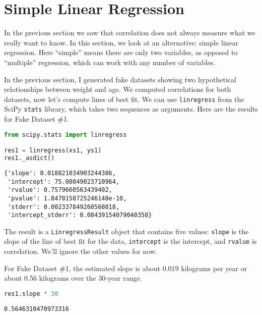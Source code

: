 \section{Simple Linear Regression}\label{simple-linear-regression}

In the previous section we saw that correlation does not always measure
what we really want to know. In this section, we look at an alternative:
simple linear regression. Here ``simple'' means there are only two
variables, as opposed to ``multiple'' regression, which can work with
any number of variables.

In the previous section, I generated fake datasets showing two
hypothetical relationships between weight and age. We computed
correlations for both datasets, now let's compute lines of best fit. We
can use \passthrough{\lstinline!linregress!} from the SciPy
\passthrough{\lstinline!stats!} library, which takes two sequences as
arguments. Here are the results for Fake Dataset \#1.


\begin{lstlisting}[language=Python,style=source]
from scipy.stats import linregress

res1 = linregress(xs1, ys1)
res1._asdict()
\end{lstlisting}

\begin{lstlisting}[style=output]
{'slope': 0.018821034903244386,
 'intercept': 75.08049023710964,
 'rvalue': 0.7579660563439402,
 'pvalue': 1.8470158725246148e-10,
 'stderr': 0.002337849260560818,
 'intercept_stderr': 0.08439154079040358}
\end{lstlisting}

The result is a \passthrough{\lstinline!LinregressResult!} object that
contains five values: \passthrough{\lstinline!slope!} is the slope of
the line of best fit for the data, \passthrough{\lstinline!intercept!}
is the intercept, and \passthrough{\lstinline!rvalue!} is correlation.
We'll ignore the other values for now.

For Fake Dataset \#1, the estimated slope is about 0.019 kilograms per
year or about 0.56 kilograms over the 30-year range.

\begin{lstlisting}[language=Python,style=source]
res1.slope * 30
\end{lstlisting}

\begin{lstlisting}[style=output]
0.5646310470973316
\end{lstlisting}

